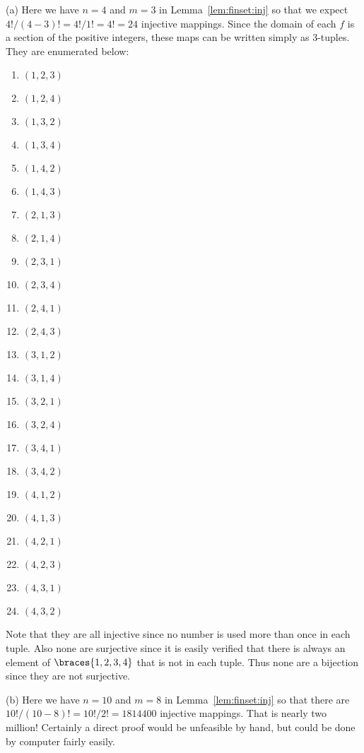 {  (a) Here we have $n=4$ and $m=3$ in Lemma~\ref{lem:finset:inj} so that we expect $4!/(4-3)! = 4!/1! = 4! = 24$ injective mappings.
  Since the domain of each $f$ is a section of the positive integers, these maps can be written simply as 3-tuples.
  They are enumerated below:
  \begin{multicols}{4}
    \begin{enumerate}[itemsep=0cm]
    \item $(1, 2, 3)$
    \item $(1, 2, 4)$
    \item $(1, 3, 2)$
    \item $(1, 3, 4)$
    \item $(1, 4, 2)$
    \item $(1, 4, 3)$
    \item $(2, 1, 3)$
    \item $(2, 1, 4)$
    \item $(2, 3, 1)$
    \item $(2, 3, 4)$
    \item $(2, 4, 1)$
    \item $(2, 4, 3)$
    \item $(3, 1, 2)$
    \item $(3, 1, 4)$
    \item $(3, 2, 1)$
    \item $(3, 2, 4)$
    \item $(3, 4, 1)$
    \item $(3, 4, 2)$
    \item $(4, 1, 2)$
    \item $(4, 1, 3)$
    \item $(4, 2, 1)$
    \item $(4, 2, 3)$
    \item $(4, 3, 1)$
    \item $(4, 3, 2)$
    \end{enumerate}
  \end{multicols}
  Note that they are all injective since no number is used more than once in each tuple.
  Also none are surjective since it is easily verified that there is always an element of $\braces{1,2,3,4}$ that is not in each tuple.
  Thus none are a bijection since they are not surjective.

  (b) Here we have $n = 10$ and $m = 8$ in Lemma~\ref{lem:finset:inj} so that there are $10! / (10-8)! = 10! / 2! = 1814400$ injective mappings.
  That is nearly two million!
  Certainly a direct proof would be unfeasible by hand, but could be done by computer fairly easily.
}

